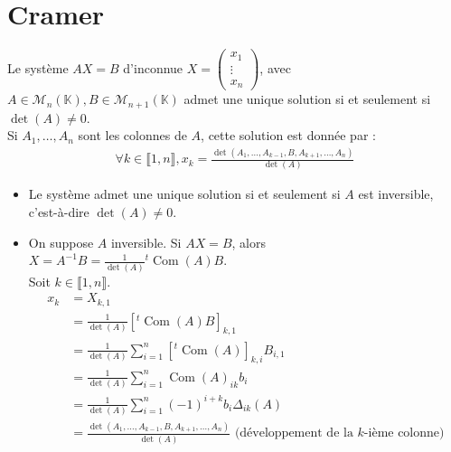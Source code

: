 \documentclass[../main.tex]{subfiles}
\begin{document}
\section{Cramer}
\begin{tcolorbox}[title=Corollaire 30.63, title filled=false, colframe=orange, colback=orange!10!white]
    Le système $AX = B$ d'inconnue $X = \begin{pmatrix}
        x_1 \\
        \vdots \\
        x_n
    \end{pmatrix}$, avec $A\in \mathcal{M}_n(\mathbb{K}), B\in \mathcal{M}_{n+1}(\mathbb{K})$ admet une unique solution si et seulement si $\operatorname{det}(A)\neq 0$. \\
    Si $A_1, \ldots, A_n$ sont les colonnes de $A$, cette solution est donnée par :
    \begin{align*}
        \forall k\in \llbracket 1, n \rrbracket, x_k = \frac{\operatorname{det}(A_1, \ldots, A_{k-1}, B, A_{k+1}, \ldots, A_n)}{\operatorname{det}(A)}
    \end{align*}
\end{tcolorbox}

\begin{itemize}
    \item Le système admet une unique solution si et seulement si $A$ est inversible, c'est-à-dire $\operatorname{det}(A)\neq 0$. 
    \item On suppose $A$ inversible. Si $AX = B$, alors $X = A^{-1}B = \frac{1}{\operatorname{det}(A)} {^t \operatorname{Com}(A)B}$. \\
    Soit $k\in \llbracket 1, n \rrbracket$. \\
    \begin{align*}
        x_k &= X_{k, 1} \\
        &= \frac{1}{\operatorname{det}(A)} [^t \operatorname{Com}(A)B]_{k, 1} \\
        &= \frac{1}{\operatorname{det}(A)} \sum_{i=1}^{n} [^t \operatorname{Com}(A)]_{k, i} B_{i, 1} \\
        &= \frac{1}{\operatorname{det}(A)} \sum_{i=1}^{n} \operatorname{Com}(A)_{ik} b_i \\
        &= \frac{1}{\operatorname{det}(A)} \sum_{i=1}^{n} (-1)^{i+k} b_i \Delta_{ik}(A) \\
        &= \frac{\operatorname{det}(A_1, \ldots, A_{k-1}, B, A_{k+1}, \ldots, A_n)}{\operatorname{det}(A)} \text{ (développement de la $k$-ième colonne)} \\
    \end{align*}
\end{itemize}
\end{document}
